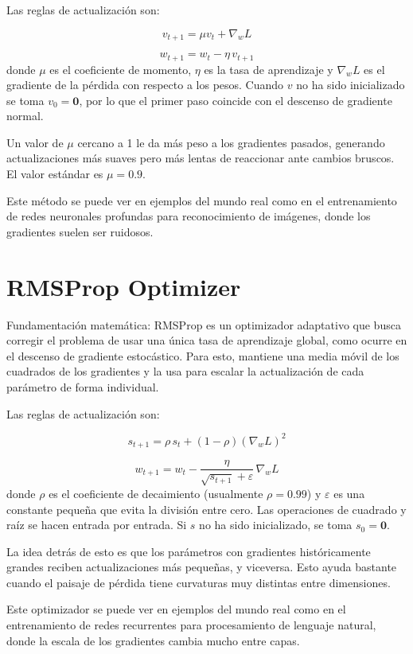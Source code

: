 \documentclass[12pt, letterpaper]{article}
\begin{document}
Las reglas de actualización son:

\[
v_{t+1} = \mu v_t + \nabla_w L
\]

\[
w_{t+1} = w_t - \eta\, v_{t+1}
\]
donde $\mu$ es el coeficiente de momento, $\eta$ es la tasa de aprendizaje y $\nabla_w L$ es el gradiente de la pérdida con respecto a los pesos. Cuando $v$ no ha sido inicializado se toma $v_0=\mathbf{0}$, por lo que el primer paso coincide con el descenso de gradiente normal.

Un valor de $\mu$ cercano a 1 le da más peso a los gradientes pasados, generando actualizaciones más suaves pero más lentas de reaccionar ante cambios bruscos. El valor estándar es $\mu=0.9$.

Este método se puede ver en ejemplos del mundo real como en el entrenamiento de redes neuronales profundas para reconocimiento de imágenes, donde los gradientes suelen ser ruidosos.


\newpage

\section{RMSProp Optimizer}

Fundamentación matemática: RMSProp es un optimizador adaptativo que busca corregir el problema de usar una única tasa de aprendizaje global, como ocurre en el descenso de gradiente estocástico. Para esto, mantiene una media móvil de los cuadrados de los gradientes y la usa para escalar la actualización de cada parámetro de forma individual.

Las reglas de actualización son:

\[
s_{t+1} = \rho\, s_t + (1-\rho)(\nabla_w L)^2
\]

\[
w_{t+1} = w_t - \frac{\eta}{\sqrt{s_{t+1}}+\varepsilon}\, \nabla_w L
\]
donde $\rho$ es el coeficiente de decaimiento (usualmente $\rho=0.99$) y $\varepsilon$ es una constante pequeña que evita la división entre cero. Las operaciones de cuadrado y raíz se hacen entrada por entrada. Si $s$ no ha sido inicializado, se toma $s_0=\mathbf{0}$.

La idea detrás de esto es que los parámetros con gradientes históricamente grandes reciben actualizaciones más pequeñas, y viceversa. Esto ayuda bastante cuando el paisaje de pérdida tiene curvaturas muy distintas entre dimensiones.

Este optimizador se puede ver en ejemplos del mundo real como en el entrenamiento de redes recurrentes para procesamiento de lenguaje natural, donde la escala de los gradientes cambia mucho entre capas.
\end{document}
